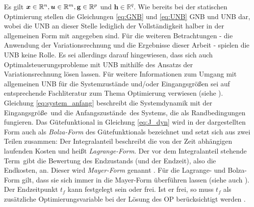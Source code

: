 Es gilt $\boldsymbol{x}\in\mathbb{R}^n, \boldsymbol{u}\in\mathbb{R}^m, \mathbf{g}\in\mathbb{R}^p$ und $\mathbf{h}\in\mathbb{R}^q$. Wie bereits bei der statischen Optimierung stellen die Gleichungen \eqref{eq:GNB} und \eqref{eq:UNB} \gls{GNB} und \gls{UNB} dar, wobei die \gls{UNB} an dieser Stelle lediglich der Vollständigkeit halber in der allgemeinen Form mit angegeben sind. Für die weiteren Betrachtungen - die Anwendung der Variationsrechnung und die Ergebnisse dieser Arbeit - spielen die \gls{UNB} keine Rolle. Es sei allerdings darauf hingewiesen, dass sich auch Optimalsteuerungsprobleme mit \gls{UNB} mithilfe des Ansatzs der Variationsrechnung lösen lassen. Für weitere Informationen zum Umgang mit allgemeinen \gls{UNB} für die Systemzustände und/oder Eingangsgrößen sei auf entsprechende Fachliteratur zum Thema Optimierung verwiesen (siehe \cite{Papageorgiou.2012, Gerdts.2010}). Gleichung \eqref{eq:system_anfang} beschreibt die Systemdynamik mit der Eingangsgröße \uoft\,und die Anfangszustände \xzero\,des Systems, die als Randbedingungen fungieren. Das Gütefunktional in Gleichung \eqref{eq:J_dyn} wird in der dargestellten Form auch als \textit{Bolza-Form} des Gütefunktionals bezeichnet und setzt sich aus zwei Teilen zusammen: Der Integralanteil beschreibt die von der Zeit abhängigen laufenden Kosten und heißt \textit{Lagrange-Form}. Der vor dem Integralanteil stehende Term \Vofxoftf\,gibt die Bewertung des Endzustands (und der Endzeit), also die Endkosten, an. Dieser wird \textit{Mayer-Form} genannt \cite{KnutGraichen.2012}. Für die Lagrange- und Bolza-Form gilt, dass sie sich immer in die Mayer-Form überführen lassen \cite{KnutGraichen.2012} (siehe auch \cite{Gerdts.2010}). Der Endzeitpunkt $t_f$ kann festgelegt sein oder frei. Ist er frei, so muss $t_f$ als zusätzliche Optimierungsvariable bei der Lösung des \gls{OP} berücksichtigt werden \cite{KnutGraichen.2012}. 
